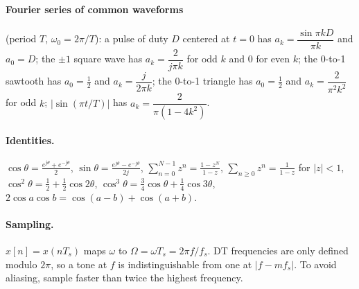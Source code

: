 \documentclass[11pt]{article}
\numberwithin{equation}{section}
\theoremstyle{definition}
\theoremstyle{remark}
\begin{document}
\paragraph{Fourier series of common waveforms} (period $T$, $\omega_0=2\pi/T$):
a pulse of duty $D$ centered at $t=0$ has $a_k=\dfrac{\sin\pi kD}{\pi k}$ and $a_0=D$;
the $\pm1$ square wave has $a_k=\dfrac{2}{j\pi k}$ for odd $k$ and 0 for even $k$;
the 0-to-1 sawtooth has $a_0=\frac12$ and $a_k=\dfrac{j}{2\pi k}$;
the 0-to-1 triangle has $a_0=\frac12$ and $a_k=\dfrac{2}{\pi^2k^2}$ for odd $k$;
$|\sin(\pi t/T)|$ has $a_k=\dfrac{2}{\pi(1-4k^2)}$.

\paragraph{Identities.}
$\cos\theta=\frac{e^{j\theta}+e^{-j\theta}}2$, $\sin\theta=\frac{e^{j\theta}-e^{-j\theta}}{2j}$,
$\sum_{n=0}^{N-1}z^n=\frac{1-z^N}{1-z}$, $\sum_{n\ge0}z^n=\frac{1}{1-z}$ for $|z|<1$,
$\cos^2\theta=\frac12+\frac12\cos2\theta$, $\cos^3\theta=\frac34\cos\theta+\frac14\cos3\theta$,
$2\cos a\cos b=\cos(a-b)+\cos(a+b)$.

\paragraph{Sampling.} $x[n]=x(nT_s)$ maps $\omega$ to $\Omega=\omega T_s=2\pi f/f_s$. DT frequencies are
only defined modulo $2\pi$, so a tone at $f$ is indistinguishable from one at $|f-mf_s|$. To avoid
aliasing, sample faster than twice the highest frequency.
\end{document}
